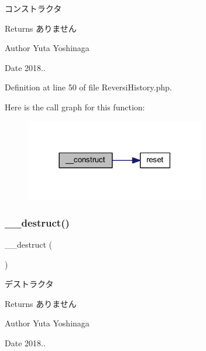 コンストラクタ 

\begin{DoxyReturn}{Returns}
ありません 
\end{DoxyReturn}
\begin{DoxyAuthor}{Author}
Yuta Yoshinaga 
\end{DoxyAuthor}
\begin{DoxyDate}{Date}
2018.. 
\end{DoxyDate}


Definition at line 50 of file Reversi\+History.\+php.

Here is the call graph for this function\+:
\nopagebreak
\begin{figure}[H]
\begin{center}
\leavevmode
\includegraphics[width=222pt]{class_reversi_history_a095c5d389db211932136b53f25f39685_cgraph}
\end{center}
\end{figure}
\mbox{\label{class_reversi_history_a421831a265621325e1fdd19aace0c758}} 
\subsubsection{\texorpdfstring{\+\_\+\+\_\+destruct()}{\_\_destruct()}}
{\footnotesize\ttfamily \+\_\+\+\_\+destruct (\begin{DoxyParamCaption}{ }\end{DoxyParamCaption})}



デストラクタ 

\begin{DoxyReturn}{Returns}
ありません 
\end{DoxyReturn}
\begin{DoxyAuthor}{Author}
Yuta Yoshinaga 
\end{DoxyAuthor}
\begin{DoxyDate}{Date}
2018.. 
\end{DoxyDate}


